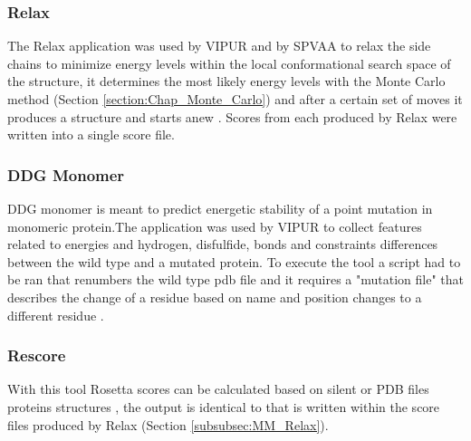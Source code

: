 \subsubsection{Relax}
The Relax application was used by VIPUR and by SPVAA to relax the side chains to minimize energy levels within the local conformational search space \cite{rosetta_commons_relax_nodate} of the structure, it determines the most likely energy levels with the Monte Carlo method (Section \ref{section:Chap_Monte_Carlo}) and after a certain set of moves it produces a structure and starts anew \cite{conway_relaxation_2014,tyka_alternate_2011}. Scores from each produced by Relax were written into a single score file.
\label{subsubsec:MM_Relax}

\subsubsection{DDG Monomer}
DDG monomer is meant to predict energetic stability of a point mutation in  monomeric protein.The application was used by VIPUR to collect features related to energies and hydrogen, disfulfide, bonds and constraints differences between the wild type and a mutated protein. To execute the tool a script had to be ran that renumbers the wild type pdb file and it requires a "mutation file" that describes the change of a residue based on name and position changes to a different residue \cite{leaver-fay_ddg_monomer_nodate}.
\label{subsubsec:MM_DDG_Monomer}

\subsubsection{Rescore}
With this tool Rosetta scores can be calculated based on silent or PDB files proteins structures \cite{jared_score_2016} , the output is identical to that is written within the score files produced by Relax (Section \ref{subsubsec:MM_Relax}).
\label{subsubsec:MM_Rescore}


